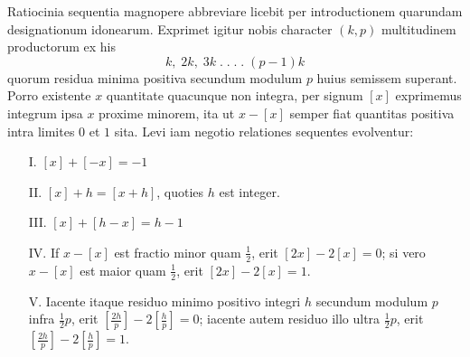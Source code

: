 \documentclass[14pt]{memoir}
\begin{document}
Ratiocinia sequentia magnopere abbreviare licebit per introductionem quarundam designationum idonearum. Exprimet igitur nobis character \((k, p)\) multitudinem productorum ex his 
\[ k,\;2k,\;3k\;.\;.\;.\;.\;(p-1)k \]
quorum residua minima positiva secundum modulum \(p\) huius semissem superant. Porro existente \(x\) quantitate quacunque non integra, per signum \([x]\) exprimemus integrum ipsa \(x\) proxime minorem, ita ut \(x-[x]\) semper fiat quantitas positiva intra limites \(0\) et \(1\) sita. Levi iam negotio relationes sequentes evolventur: 
\begin{enumerate}[itemsep=0em]
\item[I.] \([x] + [-x] = -1\) 
\item[II.] \([x] + h = [x+h]\), quoties \(h\) est integer.
\item[III.] \([x] + [h-x] = h-1\)
\item[IV.] If \(x-[x]\) est fractio minor quam \(\tfrac{1}{2}\), erit \([2x]-2[x]=0\); si vero \(x-[x]\) est maior quam \(\tfrac{1}{2}\), erit $[2x]-2[x]=1$.
\item[V.] Iacente itaque residuo minimo positivo integri \(h\) secundum modulum \(p\) infra \(\tfrac{1}{2}p\), erit \(\left[\tfrac{2h}{p}\right]-2\left[\tfrac{h}{p}\right] = 0\); iacente autem residuo illo ultra \(\tfrac{1}{2} p\), erit \(\left[\tfrac{2h}{p}\right]-2\left[\tfrac{h}{p}\right] = 1\).
\end{enumerate}%
\end{document}
